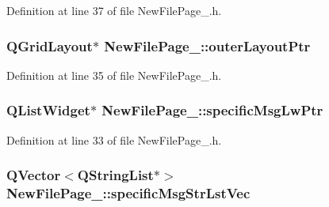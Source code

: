 Definition at line 37 of file New\-File\-Page\-\_.\-h.

\hypertarget{class_new_file_page__3_a3cfae6c3a60d34d9e1f481046e5b4a45}{
\subsubsection[{outer\-Layout\-Ptr}]{\setlength{\rightskip}{0pt plus 5cm}Q\-Grid\-Layout$\ast$ New\-File\-Page\-\_\-::outer\-Layout\-Ptr\hspace{0.3cm}{\ttfamily [private]}}}\label{class_new_file_page__3_a3cfae6c3a60d34d9e1f481046e5b4a45}


Definition at line 35 of file New\-File\-Page\-\_.\-h.

\hypertarget{class_new_file_page__3_a1cf3ff30d6f22ed78cd9215c0f21697c}{
\subsubsection[{specific\-Msg\-Lw\-Ptr}]{\setlength{\rightskip}{0pt plus 5cm}Q\-List\-Widget$\ast$ New\-File\-Page\-\_\-::specific\-Msg\-Lw\-Ptr\hspace{0.3cm}{\ttfamily [private]}}}\label{class_new_file_page__3_a1cf3ff30d6f22ed78cd9215c0f21697c}


Definition at line 33 of file New\-File\-Page\-\_.\-h.

\hypertarget{class_new_file_page__3_a6d8b5daf0fff54a17b1a2acb1a4fbd0b}{
\subsubsection[{specific\-Msg\-Str\-Lst\-Vec}]{\setlength{\rightskip}{0pt plus 5cm}Q\-Vector$<$Q\-String\-List$\ast$$>$ New\-File\-Page\-\_\-::specific\-Msg\-Str\-Lst\-Vec\hspace{0.3cm}{\ttfamily [private]}}}\label{class_new_file_page__3_a6d8b5daf0fff54a17b1a2acb1a4fbd0b}


